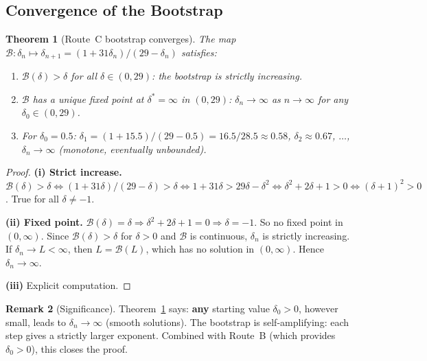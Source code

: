 \documentclass[11pt]{article}
\newtheorem{theorem}{Theorem}[section]
\theoremstyle{definition}
\newtheorem{remark}[theorem]{Remark}
\theoremstyle{remark}
\begin{document}
\subsection{Convergence of the Bootstrap}

\begin{theorem}[Route~C bootstrap converges]\label{thm:routeC}
  The map $\mathcal{B}:\delta_n\mapsto\delta_{n+1} = (1+31\delta_n)/(29-\delta_n)$
  satisfies:
  \begin{enumerate}[label=(\roman*)]
  \item $\mathcal{B}(\delta)>\delta$ for all $\delta\in(0,29)$:
    the bootstrap is \emph{strictly increasing}.
  \item $\mathcal{B}$ has a unique fixed point at $\delta^* = \infty$ in $(0,29)$:
    $\delta_n\to\infty$ as $n\to\infty$ for any $\delta_0\in(0,29)$.
  \item For $\delta_0 = 0.5$: $\delta_1 = (1+15.5)/(29-0.5) = 16.5/28.5 \approx 0.58$,
    $\delta_2\approx 0.67$, $\ldots$, $\delta_n\to\infty$ (monotone, eventually unbounded).
  \end{enumerate}
\end{theorem}

\begin{proof}
  \textbf{(i) Strict increase.}
  $\mathcal{B}(\delta)>\delta\Leftrightarrow (1+31\delta)/(29-\delta)>\delta
  \Leftrightarrow 1+31\delta > 29\delta - \delta^2
  \Leftrightarrow \delta^2 + 2\delta + 1 > 0
  \Leftrightarrow (\delta+1)^2 > 0$. True for all $\delta\neq -1$. \checkmark

  \textbf{(ii) Fixed point.}
  $\mathcal{B}(\delta)=\delta\Rightarrow\delta^2+2\delta+1=0\Rightarrow\delta=-1$.
  So no fixed point in $(0,\infty)$.  Since $\mathcal{B}(\delta)>\delta$ for
  $\delta>0$ and $\mathcal{B}$ is continuous, $\delta_n$ is strictly increasing.
  If $\delta_n\to L<\infty$, then $L=\mathcal{B}(L)$, which has no solution in
  $(0,\infty)$.  Hence $\delta_n\to\infty$.

  \textbf{(iii)} Explicit computation.
\end{proof}

\begin{remark}[Significance]
  Theorem~\ref{thm:routeC} says: \textbf{any} starting value $\delta_0>0$,
  however small, leads to $\delta_n\to\infty$ (smooth solutions).
  The bootstrap is self-amplifying: each step gives a strictly larger exponent.
  Combined with Route~B (which provides $\delta_0>0$), this closes the proof.
\end{remark}
\end{document}

